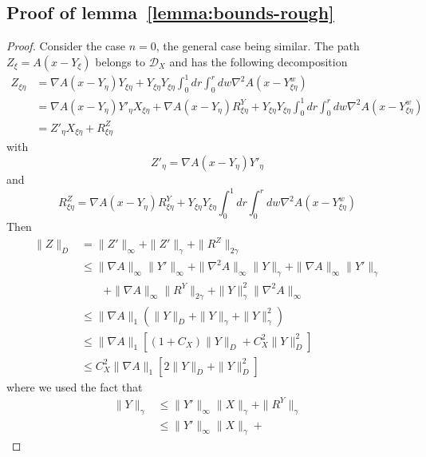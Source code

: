 \documentclass[a4paper,12pt,reqno]{amsart}
\newcommand{\norm}[1]{\|#1\|}
\newcommand{\DX}{\mathscr{D}_{X}}
\begin{document}
\subsection{Proof of lemma~\ref{lemma:bounds-rough}}
\label{sec:proof-bounds-rough}
\begin{proof}
Consider the case $n=0$, the general case being similar.
The path $Z_\xi = A(x-Y_\xi)$ belongs to $\DX$ and has the following
decomposition
\begin{equation*}
  \begin{split}
  Z_{\xi\eta}
& =  \nabla A(x-Y_\eta) Y_{\xi\eta} + Y_{\xi\eta} Y_{\xi\eta}
\int_0^1 dr \int_0^r dw \nabla^2 A(x-Y_{\xi\eta}^w)
\\& =  \nabla A(x-Y_\eta) Y'_\eta X_{\xi\eta}+ \nabla A(x-Y_\eta) R^Y_{\xi\eta} + Y_{\xi\eta} Y_{\xi\eta}
\int_0^1 dr \int_0^r dw \nabla^2 A(x-Y_{\xi\eta}^w)
\\ & = Z'_\eta X_{\xi\eta} + R^Z_{\xi\eta}
  \end{split}
 \end{equation*}
with
$$
Z'_\eta = \nabla A(x-Y_\eta) Y'_\eta
$$
and
$$
R^{Z}_{\xi\eta} = \nabla A(x-Y_\eta) R^Y_{\xi\eta} + Y_{\xi\eta} Y_{\xi\eta}
\int_0^1 dr \int_0^r dw \nabla^2 A(x-Y_{\xi\eta}^w)
$$
Then
\begin{equation}
\label{eq:boundzzz}
  \begin{split}
\norm{Z}_D & = \norm{Z'}_\infty + \norm{Z'}_\gamma +
\norm{R^Z}_{2\gamma}
\\ & \le \norm{\nabla A}_\infty \norm{Y'}_\infty + \norm{\nabla^2
  A}_\infty \norm{Y}_\gamma + \norm{\nabla A}_\infty \norm{Y'}_\gamma
\\ & \qquad + \norm{\nabla A}_\infty \norm{R^Y}_{2\gamma}+
\norm{Y}_\gamma^2 \norm{\nabla^2 A}_\infty
\\ & \le \norm{\nabla A}_1 (\norm{Y}_D + \norm{Y}_\gamma +
\norm{Y}^2_\gamma)
\\ & \le \norm{\nabla A}_1 [(1+C_X) \norm{Y}_D  +
C_X^2 \norm{Y}^2_D]
\\ & \le  C_X^2 \norm{\nabla A}_1 [2 \norm{Y}_D  +
 \norm{Y}^2_D]
  \end{split}
\end{equation}
where we used the fact that
\begin{equation}
  \label{eq:bound-gamma-D}
  \begin{split}
  \norm{Y}_\gamma & \le \norm{Y'}_\infty \norm{X}_\gamma +
  \norm{R^Y}_\gamma
\\ & \le   \norm{Y'}_\infty \norm{X}_\gamma +

\end{split}
\end{equation}
\end{proof}
\end{document}

